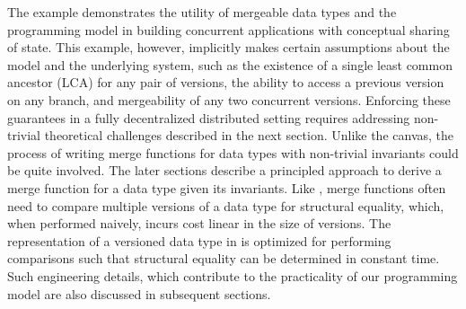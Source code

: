 The \drawsome example demonstrates the utility of mergeable data types
and the \name programming model in building concurrent applications
with conceptual sharing of state. This example, however, implicitly
makes certain assumptions about the model and the underlying system,
such as the existence of a single least common ancestor (LCA) for any
pair of versions, the ability to access a previous version on any
branch, and mergeability of any two concurrent versions. Enforcing
these guarantees in a fully decentralized distributed setting requires
addressing non-trivial theoretical challenges described in the next
section. Unlike the canvas, the process of writing merge functions for
data types with non-trivial invariants could be quite involved. The
later sections describe a principled approach to derive a merge
function for a data type given its invariants. Like ,
merge functions often need to compare multiple versions of a data type
for structural equality, which, when performed naively, incurs cost
linear in the size of versions. The representation of a versioned data
type in \name is optimized for performing comparisons such that
structural equality can be determined in constant time. Such
engineering details, which contribute to the practicality of our
programming model are also discussed in subsequent sections.

